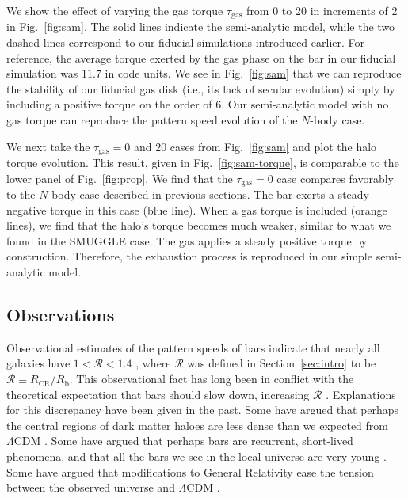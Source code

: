 \documentclass[twocolumn,linenumbers]{aastex631}
\newcommand{\RCR}{\ensuremath{R_{\textrm{CR}}}}
\newcommand{\Rot}{\ensuremath{\mathcal{R}}}
\newcommand{\Rb}{\ensuremath{R_{\textrm{b}}}}
\newcommand{\Nbody}{$N$-body}
\newcommand{\SMUGGLE}{SMUGGLE}
\begin{document}
We show the effect of varying the gas torque $\tau_{\textrm{gas}}$ from $0$ to
$20$ in increments of $2$ in Fig.~\ref{fig:sam}. The solid lines indicate the
semi-analytic model, while the two dashed lines correspond to our fiducial
simulations introduced earlier. For reference, the average torque exerted by the
gas phase on the bar in our fiducial simulation was $11.7$ in code units. We see
in Fig.~\ref{fig:sam} that we can reproduce the stability of our fiducial gas
disk (i.e., its lack of secular evolution) simply by including a positive torque
on the order of $6$. Our semi-analytic model with no gas torque can reproduce
the pattern speed evolution of the $N$-body case.

We next take the $\tau_{\textrm{gas}}=0$ and $20$ cases from Fig.~\ref{fig:sam}
and plot the halo torque evolution. This result, given in Fig.~\ref{fig:sam-torque},
is comparable to the lower panel of Fig.~\ref{fig:prop}. We find that the
$\tau_{\textrm{gas}}=0$ case compares favorably to the \Nbody{} case described
in previous sections. The bar exerts a steady negative torque in this case (blue
line). When a gas torque is included (orange lines), we find that the halo's
torque becomes much weaker, similar to what we found in the \SMUGGLE{} case. The
gas applies a steady positive torque by construction. Therefore, the exhaustion
process is reproduced in our simple semi-analytic model.

\subsection{Observations}
Observational estimates of the pattern speeds of bars indicate that nearly all
galaxies have $1 < \Rot < 1.4$ \citep{2011MSAIS..18...23C, 2015AA...576A.102A,
2019MNRAS.482.1733G, 2020MNRAS.491.3655G}, where $\Rot$ was defined in
Section~\ref{sec:intro} to be $\Rot\equiv \RCR/\Rb$. This observational fact has
long been in conflict with the theoretical expectation that bars should slow
down, increasing \Rot{} \citep[e.g.][]{1984MNRAS.209..729T, 1985MNRAS.213..451W,
2000ApJ...543..704D}. Explanations for this discrepancy have been given in the
past. Some have argued that perhaps the central regions of dark matter haloes
are less dense than we expected from $\Lambda\textrm{CDM}$
\citep[e.g.][]{2000ApJ...543..704D,2021AA...650L..16F}. Some have argued that
perhaps bars are recurrent, short-lived phenomena, and that all the bars we see
in the local universe are very young \citep{2002AA...392...83B,
2005MNRAS.364L..18B}. Some have argued that modifications to General Relativity
ease the tension between the observed universe and $\Lambda\textrm{CDM}$
\citep[e.g.][]{2021MNRAS.503.2833R, 2021MNRAS.508..926R}.
\end{document}
